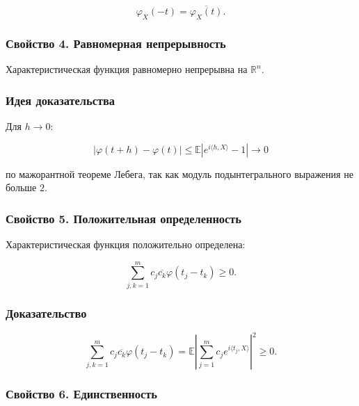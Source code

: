 \documentclass[
  11pt,
  a4paper,
]{article}
\begin{document}
\[
\varphi_X(-t)=\overline{\varphi_X(t)}.
\]

\subsubsection{Свойство 4. Равномерная
непрерывность}\label{ux441ux432ux43eux439ux441ux442ux432ux43e-4.-ux440ux430ux432ux43dux43eux43cux435ux440ux43dux430ux44f-ux43dux435ux43fux440ux435ux440ux44bux432ux43dux43eux441ux442ux44c}

Характеристическая функция равномерно непрерывна на \(\mathbb R^n\).

\subsubsection{Идея
доказательства}\label{ux438ux434ux435ux44f-ux434ux43eux43aux430ux437ux430ux442ux435ux43bux44cux441ux442ux432ux430}

Для \(h\to0\):

\[
|\varphi(t+h)-\varphi(t)|
\le
\mathbb E|e^{i\langle h,X\rangle}-1|
\to0
\]

по мажорантной теореме Лебега, так как модуль подынтегрального выражения
не больше \(2\).

\subsubsection{Свойство 5. Положительная
определенность}\label{ux441ux432ux43eux439ux441ux442ux432ux43e-5.-ux43fux43eux43bux43eux436ux438ux442ux435ux43bux44cux43dux430ux44f-ux43eux43fux440ux435ux434ux435ux43bux435ux43dux43dux43eux441ux442ux44c}

Характеристическая функция положительно определена:

\[
\sum_{j,k=1}^m c_j\overline{c_k}\varphi(t_j-t_k)\ge0.
\]

\subsubsection{Доказательство}\label{ux434ux43eux43aux430ux437ux430ux442ux435ux43bux44cux441ux442ux432ux43e-1}

\[
\sum_{j,k=1}^m c_j\overline{c_k}\varphi(t_j-t_k)
=
\mathbb E\left|\sum_{j=1}^m c_je^{i\langle t_j,X\rangle}\right|^2
\ge0.
\]

\subsubsection{Свойство 6.
Единственность}\label{ux441ux432ux43eux439ux441ux442ux432ux43e-6.-ux435ux434ux438ux43dux441ux442ux432ux435ux43dux43dux43eux441ux442ux44c}
\end{document}
